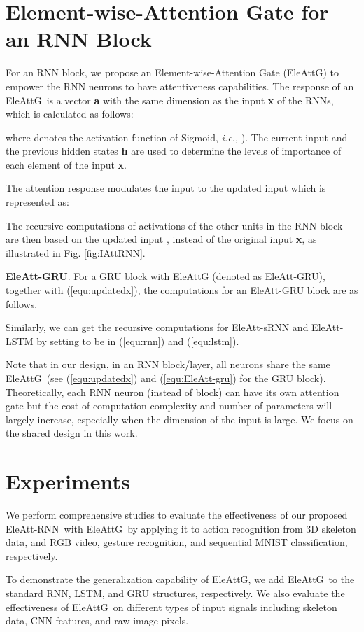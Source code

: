 \documentclass[journal]{IEEEtran}
\newcommand{\Outer}{Element-wise}
\newcommand{\EleAttGn}{{EleAttG}}
\newcommand{\EleAttG}{{EleAttG~}}
\newcommand{\EARNN}{EleAtt-RNN}
\begin{document}
\section{\Outer-Attention Gate for an RNN Block}
\label{sec:EleAtt-RNN}

For an RNN block, we propose an \Outer-Attention Gate (\EleAttGn) to empower the RNN neurons to have attentiveness capabilities. The response of an \EleAttG is a vector \textbf{{a}} with the same dimension as the input \textbf{{x}} of the RNNs, which is calculated as follows:

where  denotes the activation function of Sigmoid, {\it i.e.,} ). The current input  and the previous hidden states \textbf{{h}} are used to determine the levels of importance of each element of the input \textbf{{x}}.

The attention response modulates the input to the updated input  which is represented as: 

The recursive computations of activations of the other units in the RNN block are then based on the updated input , instead of the original input \textbf{{x}}, as illustrated in Fig. \ref{fig:IAttRNN}.

\textbf{EleAtt-GRU}. For a GRU block with EleAttG (denoted as EleAtt-GRU), together with (\ref{equ:updatedx}), the computations for an EleAtt-GRU block are as follows.


Similarly, we can get the recursive computations for EleAtt-sRNN and EleAtt-LSTM by setting  to be  in (\ref{equ:rnn}) and (\ref{equ:lstm}).

Note that in our design, in an RNN block/layer, all neurons share the same \EleAttG (see (\ref{equ:updatedx}) and (\ref{equ:EleAtt-gru}) for the GRU block). Theoretically, each RNN neuron (instead of block) can have its own attention gate but the cost of computation complexity and number of parameters will largely increase, especially when the dimension of the input is large. We focus on the shared design in this work.

\section{Experiments}
We perform comprehensive studies to evaluate the effectiveness of our proposed \EARNN~with \EleAttG by applying it to action recognition from 3D skeleton data, and RGB video, gesture recognition, and sequential MNIST classification, respectively. 

To demonstrate the generalization capability of \EleAttGn, we add \EleAttG to the standard RNN, LSTM, and GRU structures, respectively. We also evaluate the effectiveness of \EleAttG on different types of input signals including skeleton data, CNN features, and raw image pixels.
\end{document}

